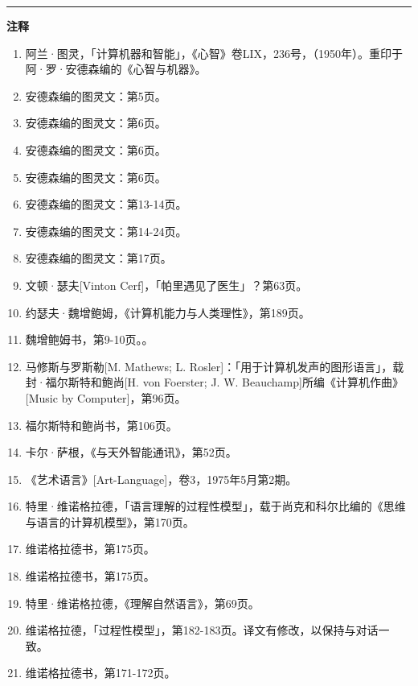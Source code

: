 \documentclass[
  12pt,
  twoside,
  openright,
  oldfontcommands,
]{memoir}
\begin{document}
{\footnotesize\setlength{\parindent}{0pt}%
\noindent\textcolor{rulegray}{\rule{0.35\linewidth}{0.3pt}}\par\vspace{2pt}
\noindent\textbf{注释}\par\vspace{3pt}
\begin{enumerate}
\label{fn:Chapter18-1}{}
\item 阿兰·图灵，「计算机器和智能」，《心智》卷LIX，236号，（1950年）。重印于阿·罗·安德森编的《心智与机器》。
\label{fn:Chapter18-2}{}
\item 安德森编的图灵文：第5页。
\label{fn:Chapter18-3}{}
\item 安德森编的图灵文：第6页。
\label{fn:Chapter18-4}{}
\item 安德森编的图灵文：第6页。
\label{fn:Chapter18-5}{}
\item 安德森编的图灵文：第6页。
\label{fn:Chapter18-6}{}
\item 安德森编的图灵文：第13-14页。
\label{fn:Chapter18-7}{}
\item 安德森编的图灵文：第14-24页。
\label{fn:Chapter18-8}{}
\item 安德森编的图灵文：第17页。
\label{fn:Chapter18-9}{}
\item 文顿·瑟夫[Vinton Cerf]，「帕里遇见了医生」？第63页。
\label{fn:Chapter18-10}{}
\item 约瑟夫·魏增鲍姆，《计算机能力与人类理性》，第189页。
\label{fn:Chapter18-11}{}
\item 魏增鲍姆书，第9-10页。。
\label{fn:Chapter18-12}{}
\item 马修斯与罗斯勒[M. Mathews; L. Rosler]：「用于计算机发声的图形语言」，载封·福尔斯特和鲍尚[H. von Foerster; J. W. Beauchamp]所编《计算机作曲》[Music by Computer]，第96页。
\label{fn:Chapter18-13}{}
\item 福尔斯特和鲍尚书，第106页。
\label{fn:Chapter18-14}{}
\item 卡尔·萨根，《与天外智能通讯》，第52页。
\label{fn:Chapter18-15}{}
\item 《艺术语言》[Art-Language]，卷3，1975年5月第2期。
\label{fn:Chapter18-16}{}
\item 特里·维诺格拉德，「语言理解的过程性模型」，载于尚克和科尔比编的《思维与语言的计算机模型》，第170页。
\label{fn:Chapter18-17}{}
\item 维诺格拉德书，第175页。
\label{fn:Chapter18-18}{}
\item 维诺格拉德书，第175页。
\label{fn:Chapter18-19}{}
\item 特里·维诺格拉德，《理解自然语言》，第69页。
\label{fn:Chapter18-20}{}
\item 维诺格拉德，「过程性模型」，第182-183页。译文有修改，以保持与对话一致。
\label{fn:Chapter18-21}{}
\item 维诺格拉德书，第171-172页。
\end{enumerate}
}
\end{document}
